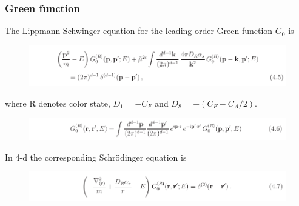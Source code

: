 \documentclass[8pt,dvipsnames,table]{beamer}
\begin{document}
\begin{frame}
	\frametitle{Green function}

	The Lippmann-Schwinger equation for the leading order Green function $G_0$ is
	\begin{figure}[!htb]
		\centering
		\includegraphics[width=\linewidth]{image26.png}
		\label{fig:image26}
	\end{figure}
	where R denotes color state, $D_1=-C_F$ and $D_8=-\left( C_F-C_A/2 \right)$.
	\begin{figure}[!htb]
		\centering
		\includegraphics[width=\linewidth]{image27.png}
		\label{fig:image27}
	\end{figure}
	In 4-d the corresponding Schr\"odinger equation is
	\begin{figure}[!htb]
		\centering
		\includegraphics[width=\linewidth]{image28.png}
		\label{fig:image28}
	\end{figure}


\end{frame}
\end{document}
